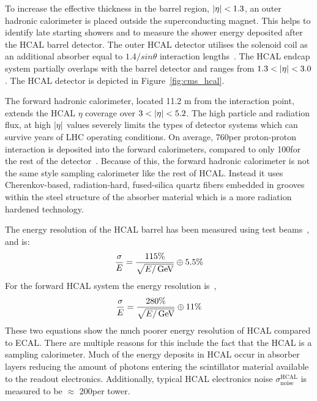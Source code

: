 To increase the effective thickness in the barrel region, $\lvert\eta\rvert < 1.3$, an outer hadronic calorimeter is placed 
outside the superconducting magnet. This helps to identify late starting showers and 
to measure the shower energy deposited after the HCAL barrel detector.
The outer HCAL detector utilises the solenoid coil as an additional absorber equal to 
$1.4/sin\theta$ interaction lengths~\cite{Chatrchyan:2008zzk}.
The HCAL endcap system partially overlaps with the barrel detector and ranges from
$1.3 < \lvert\eta\rvert < 3.0$.
The HCAL detector is depicted in Figure~\ref{fig:cms_hcal}.

The forward hadronic calorimeter, located
11.2 m from the interaction point, extends the HCAL $\eta$ coverage over $3 < \lvert\eta\rvert < 5.2$.
The high particle and radiation flux, at high $\lvert\eta\rvert$ values
severely limits the types of detector systems which can survive years of LHC operating
conditions. On average, 760\GeV per proton-proton interaction is deposited into the forward 
calorimeters, compared to only 100\GeV for the rest of the detector~\cite{Chatrchyan:2008zzk}.
Because of this, the forward hadronic calorimeter is not the same style sampling
calorimeter like the rest of HCAL. Instead it uses Cherenkov-based, 
radiation-hard, fused-silica quartz fibers embedded in grooves within the steel structure
of the absorber material which is a more radiation hardened technology.

The energy resolution of the HCAL barrel has been measured using test beams~\cite{Elvira:800406}, and is:
\begin{equation}
\label{eqn:hcal_res}
\frac{\sigma}{E} = \frac{115\%}{\sqrt{E/\,\mathrm{GeV}}} \oplus 5.5\%
\end{equation}
For the forward HCAL system the energy resolution is~\cite{Baiatian:951395},
\begin{equation}
\label{eqn:hcal_res}
\frac{\sigma}{E} = \frac{280\%}{\sqrt{E/\,\mathrm{GeV}}} \oplus 11\%
\end{equation}
These two equations show the much poorer energy resolution of HCAL compared to ECAL.
There are multiple reasons for this include the fact that the HCAL is a sampling 
calorimeter. Much of the energy deposits in HCAL occur in absorber layers reducing
the amount of photons entering the scintillator material available to the readout electronics.
Additionally, typical HCAL electronics noise $\sigma ^{\text{HCAL}} _{\text{noise}}$ 
is measured to be $\approx$ 200\MeV per tower.

